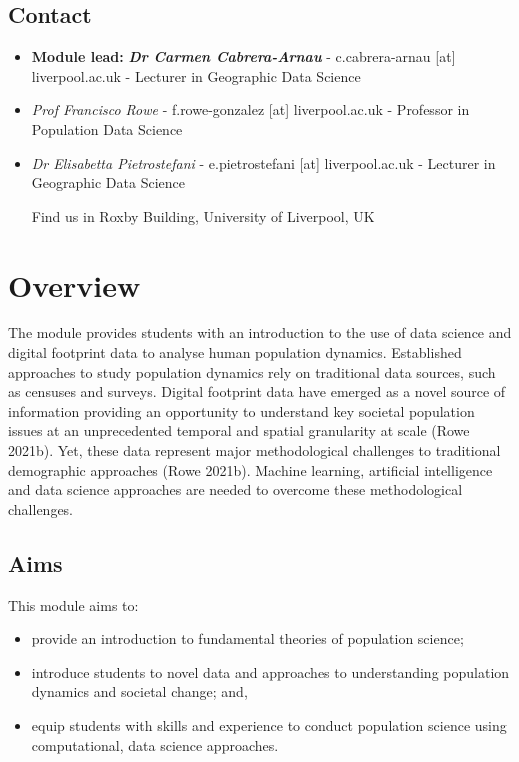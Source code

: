 \documentclass[
  letterpaper,
  DIV=11,
  numbers=noendperiod]{scrreprt}
\begin{document}
\hypertarget{contact}{%
\section*{Contact}\label{contact}}


\begin{itemize}
\item
  \textbf{Module lead:} \textbf{\emph{Dr Carmen Cabrera-Arnau}} -
  c.cabrera-arnau {[}at{]} liverpool.ac.uk - Lecturer in Geographic Data
  Science
\item
  \emph{Prof Francisco Rowe} - f.rowe-gonzalez {[}at{]} liverpool.ac.uk
  - Professor in Population Data Science
\item
  \emph{Dr Elisabetta Pietrostefani} - e.pietrostefani {[}at{]}
  liverpool.ac.uk - Lecturer in Geographic Data Science

  Find us in Roxby Building, University of Liverpool, UK
\end{itemize}


\hypertarget{overview}{%
\chapter{Overview}\label{overview}}

The module provides students with an introduction to the use of data
science and digital footprint data to analyse human population dynamics.
Established approaches to study population dynamics rely on traditional
data sources, such as censuses and surveys. Digital footprint data have
emerged as a novel source of information providing an opportunity to
understand key societal population issues at an unprecedented temporal
and spatial granularity at scale (Rowe 2021b). Yet, these data represent
major methodological challenges to traditional demographic approaches
(Rowe 2021b). Machine learning, artificial intelligence and data science
approaches are needed to overcome these methodological challenges.

\hypertarget{aims}{%
\section{Aims}\label{aims}}

This module aims to:

\begin{itemize}
\item
  provide an introduction to fundamental theories of population science;
\item
  introduce students to novel data and approaches to understanding
  population dynamics and societal change; and,
\item
  equip students with skills and experience to conduct population
  science using computational, data science approaches.
\end{itemize}
\end{document}
